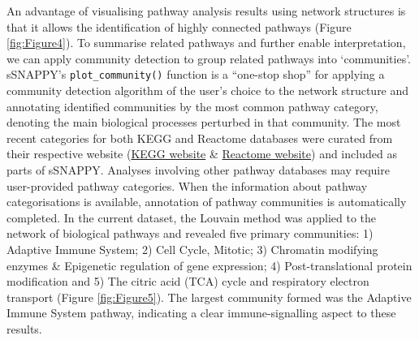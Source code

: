 \documentclass[9pt,a4paper,]{extarticle}
\begin{document}
An advantage of visualising pathway analysis results using network structures is that it allows the identification of highly connected pathways (Figure \ref{fig:Figure4}).
To summarise related pathways and further enable interpretation, we can apply community detection\citep{Newman2004} to group related pathways into `communities'.
sSNAPPY's \texttt{plot\_community()} function is a ``one-stop shop'' for applying a community detection algorithm of the user's choice to the network structure and annotating identified communities by the most common pathway category, denoting the main biological processes perturbed in that community.
The most recent categories for both KEGG and Reactome databases were curated from their respective website (\href{https://www.genome.jp/kegg/pathway.html}{KEGG website} \& \href{https://reactome.org/PathwayBrowser/\#/R-HSA-1632852\&PATH=R-HSA-9612973}{Reactome website}) and included as parts of sSNAPPY.
Analyses involving other pathway databases may require user-provided pathway categories.
When the information about pathway categorisations is available, annotation of pathway communities is automatically completed.
In the current dataset, the Louvain method was applied to the network of biological pathways and revealed five primary communities: 1) Adaptive Immune System; 2) Cell Cycle, Mitotic; 3) Chromatin modifying enzymes \& Epigenetic regulation of gene expression; 4) Post-translational protein modification and 5) The citric acid (TCA) cycle and respiratory electron transport (Figure \ref{fig:Figure5}).
The largest community formed was the Adaptive Immune System pathway, indicating a clear immune-signalling aspect to these results.
\end{document}
